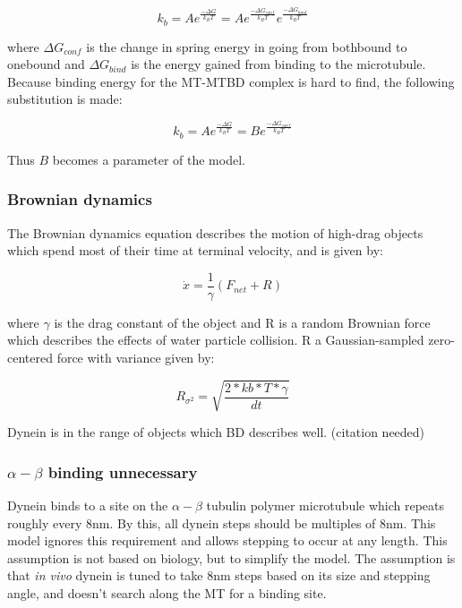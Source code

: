 \documentclass[10pt]{article} %
\begin{document}
\begin{equation}
  k_b = Ae^{\frac{-\Delta G}{k_BT}} = Ae^{\frac{-\Delta G_{conf}}{k_BT}}e^{\frac{-\Delta G_{bind}}{k_BT}}
\end{equation}

where $\Delta G_{conf}$ is the change in spring energy in going from bothbound to onebound and $\Delta G_{bind}$ is the energy gained from binding to the microtubule. Because binding energy for the MT-MTBD complex is hard to find, the following substitution is made:

\begin{equation}
  k_b = Ae^{\frac{-\Delta G}{k_BT}} = Be^{\frac{-\Delta G_{conf}}{k_BT}}
\end{equation}

Thus $B$ becomes a parameter of the model.\\

\subsubsection{Brownian dynamics}
The Brownian dynamics equation describes the motion of high-drag objects which spend most of their time at terminal velocity, and is given by:

\begin{equation}
  \dot{x} = \frac{1}{\gamma}\left(F_{net} + R\right)
\end{equation}

where $\gamma$ is the drag constant of the object and R is a random Brownian force which describes the effects of water particle collision. R a Gaussian-sampled zero-centered force with variance given by:

\begin{equation}
  R_{\sigma^2} = \sqrt{\frac{2*kb*T*\gamma}{dt}}
\end{equation}

Dynein is in the range of objects which BD describes well. (citation needed)

\subsubsection{$\alpha-\beta$ binding unnecessary}
Dynein binds to a site on the $\alpha-\beta$ tubulin polymer microtubule which repeats roughly every 8nm. By this, all dynein steps should be multiples of $8$nm. This model ignores this requirement and allows stepping to occur at any length. This assumption is not based on biology, but to simplify the model. The assumption is that \textit{in vivo} dynein is tuned to take 8nm steps based on its size and stepping angle, and doesn't search along the MT for a binding site.\\
\end{document}
